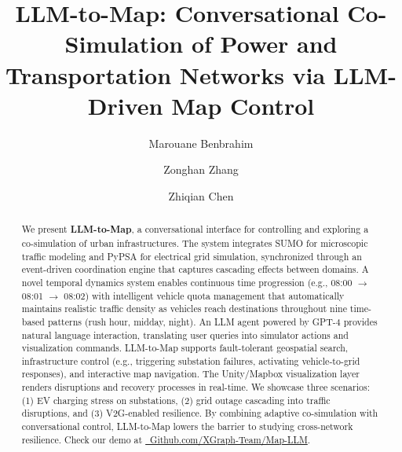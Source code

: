 \documentclass[sigconf,review,nonacm]{acmart}
\begin{document}
\title{LLM-to-Map: Conversational Co-Simulation of Power and Transportation Networks via LLM-Driven Map Control}

\author{Marouane Benbrahim}

\author{Zonghan Zhang}

\author{Zhiqian Chen}

\renewcommand{\shortauthors}{Benbrahim et al.}

\begin{abstract}
We present \textbf{LLM-to-Map}, a conversational interface for controlling and exploring a co-simulation of urban infrastructures. The system integrates SUMO for microscopic traffic modeling and PyPSA for electrical grid simulation, synchronized through an event-driven coordination engine that captures cascading effects between domains. A novel temporal dynamics system enables continuous time progression (e.g., 08:00 $\rightarrow$ 08:01 $\rightarrow$ 08:02) with intelligent vehicle quota management that automatically maintains realistic traffic density as vehicles reach destinations throughout nine time-based patterns (rush hour, midday, night). An LLM agent powered by GPT-4 provides natural language interaction, translating user queries into simulator actions and visualization commands. LLM-to-Map supports fault-tolerant geospatial search, infrastructure control (e.g., triggering substation failures, activating vehicle-to-grid responses), and interactive map navigation. The Unity/Mapbox visualization layer renders disruptions and recovery processes in real-time. We showcase three scenarios: (1) EV charging stress on substations, (2) grid outage cascading into traffic disruptions, and (3) V2G-enabled resilience. By combining adaptive co-simulation with conversational control, LLM-to-Map lowers the barrier to studying cross-network resilience. Check our demo at \href{https://github.com/XGraph-Team/Map-LLM}{\faGithub\ Github.com/XGraph-Team/Map-LLM}.
\end{abstract}

\maketitle
\end{document}
